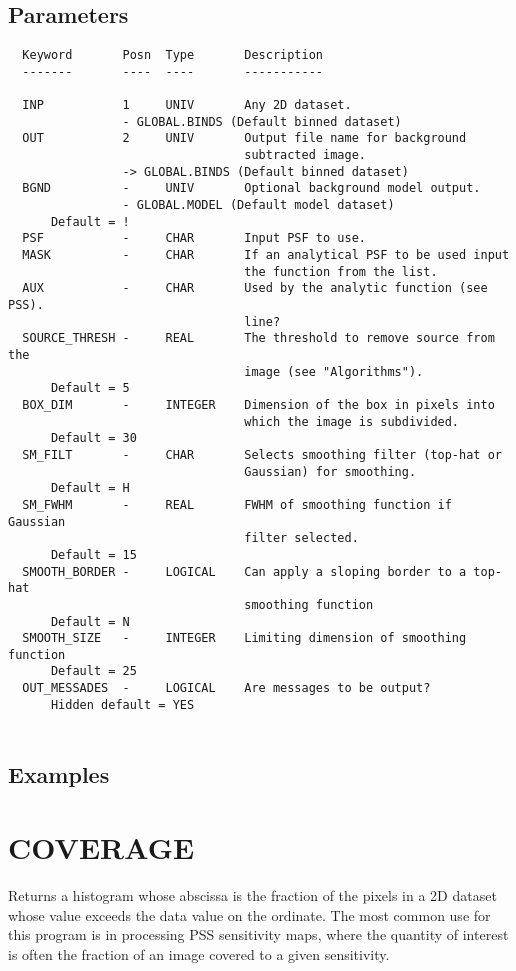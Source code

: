 \documentclass{book}
\renewcommand{\_}{{\tt\char'137}}     %
\begin{document}
\subsection{Parameters}
\begin{verbatim}
  Keyword       Posn  Type       Description
  -------       ----  ----       -----------
 
  INP           1     UNIV       Any 2D dataset.
                - GLOBAL.BINDS (Default binned dataset)
  OUT           2     UNIV       Output file name for background
                                 subtracted image.
                -> GLOBAL.BINDS (Default binned dataset)
  BGND          -     UNIV       Optional background model output.
                - GLOBAL.MODEL (Default model dataset)
      Default = !
  PSF           -     CHAR       Input PSF to use.
  MASK          -     CHAR       If an analytical PSF to be used input
                                 the function from the list.
  AUX           -     CHAR       Used by the analytic function (see PSS).
                                 line?
  SOURCE_THRESH -     REAL       The threshold to remove source from the
                                 image (see "Algorithms").
      Default = 5
  BOX_DIM       -     INTEGER    Dimension of the box in pixels into
                                 which the image is subdivided.
      Default = 30
  SM_FILT       -     CHAR       Selects smoothing filter (top-hat or
                                 Gaussian) for smoothing.
      Default = H
  SM_FWHM       -     REAL       FWHM of smoothing function if Gaussian
                                 filter selected.
      Default = 15
  SMOOTH_BORDER -     LOGICAL    Can apply a sloping border to a top-hat
                                 smoothing function
      Default = N
  SMOOTH_SIZE   -     INTEGER    Limiting dimension of smoothing function
      Default = 25
  OUT_MESSADES  -     LOGICAL    Are messages to be output?
      Hidden default = YES
 
\end{verbatim}\subsection{Examples}
\section{COVERAGE}
Returns a histogram whose abscissa is the fraction of the pixels in
a 2D dataset whose value exceeds the data value on the ordinate.
The most common use for this program is in processing PSS sensitivity
maps, where the quantity of interest is often the fraction of an
image covered to a given sensitivity.
 
\end{document}
